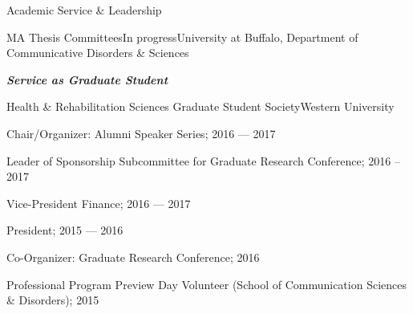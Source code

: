 \documentclass{resume} %
\begin{document}
\begin{rSection}{Academic Service \& Leadership}
\begin{rSubsection}{MA Thesis Committees}{In progress}{University at Buffalo, Department of Communicative Disorders \& Sciences}{}
\bigskip
\begin{center}
	{\bf \emph{Service as Graduate Student}}\\
\end{center}

\begin{rSubsection}{Health \& Rehabilitation Sciences Graduate Student Society}{}{Western University}{}
	\item Chair/Organizer: Alumni Speaker Series; 2016 --- 2017
	\item Leader of Sponsorship Subcommittee for Graduate Research Conference; 2016 --2017
	\item Vice-President Finance; 2016 --- 2017
	\item President; 2015 --- 2016
	\item Co-Organizer: Graduate Research Conference; 2016
	\item Professional Program Preview Day Volunteer (School of Communication Sciences \& Disorders); 2015
\end{rSubsection}

%	
%	
%	
%	
%	
%	



\end{rSubsection}
\end{rSection}
\end{document}
